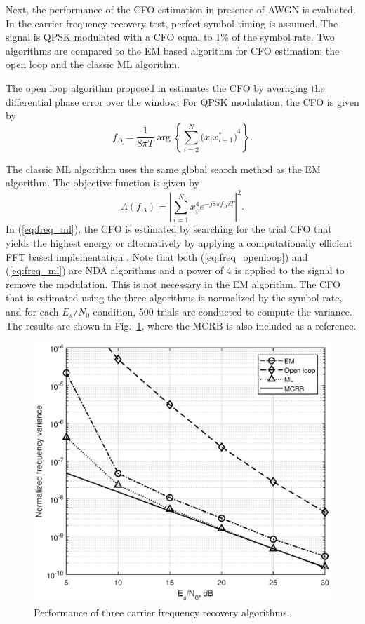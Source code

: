\documentclass[12pt, draftclsnofoot, onecolumn]{IEEEtran}
\begin{document}

Next, the performance of the CFO estimation in presence of AWGN is evaluated.
In the carrier frequency recovery test, perfect symbol timing is assumed.
The signal is QPSK modulated with a CFO equal to 1\% of the symbol rate.
Two algorithms are compared to the EM based algorithm for CFO estimation:
the open loop and the classic ML algorithm.

The open loop algorithm proposed in \cite{Chuang1991} estimates the CFO  by averaging the differential phase error over the window.
For QPSK modulation, the CFO is given by \cite{mengali1997synchronization}
\begin{equation}
f_\Delta = \frac{1}{8 \pi T} \arg \left\{ {\sum\limits_{i = 2}^{{N} } {{{\big( {x_i x^*_{i-1}} \big)}^4}} } \right\}.
\label{eq:freq_openloop}
\end{equation}

The classic ML algorithm uses the same global search method as the EM algorithm.
The objective function is given by 
\begin{equation}
\Lambda (f_\Delta)=\left| \sum\limits_{i = 1}^N {{{ {{x^4_i}e^{-j8\pi f_\Delta i T}}}}} \right|^2. 
\label{eq:freq_ml}
\end{equation}
In (\ref{eq:freq_ml}), the CFO is estimated by searching for the trial CFO that yields the highest energy or alternatively by applying a computationally efficient FFT based implementation \cite{Wang2004}.
Note that both (\ref{eq:freq_openloop}) and (\ref{eq:freq_ml}) are NDA algorithms and a power of 4 is applied to the signal to remove the modulation.
This is not necessary in the EM algorithm.
The CFO that is estimated using the three algorithms is normalized by the symbol rate,
and for each \(E_s/N_0\) condition, 500 trials are conducted to compute the variance.
The results are shown in Fig.~\ref{fig:per_freq}, where the MCRB is also included as a reference.

\begin{figure}[ht]
\centering
\includegraphics[width=3.1 in]{pic/per_freq-k.eps}
\caption{Performance of three carrier frequency recovery algorithms.}
\label{fig:per_freq} 
\end{figure} 
\end{document}
